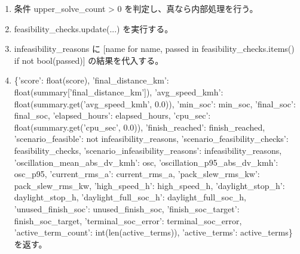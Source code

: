 \documentclass[a4paper,11pt]{article}
\begin{document}
\begin{enumerate}[leftmargin=1.8em]
\item 条件 upper\_solve\_count > 0 を判定し、真なら内部処理を行う。
\item   feasibility\_checks.update(...) を実行する。
\item infeasibility\_reasons に [name for name, passed in feasibility\_checks.items() if not bool(passed)] の結果を代入する。
\item \{'score': float(score), 'final\_distance\_km': float(summary['final\_distance\_km']), 'avg\_speed\_kmh': float(summary.get('avg\_speed\_kmh', 0.0)), 'min\_soc': min\_soc, 'final\_soc': final\_soc, 'elapsed\_hours': elapsed\_hours, 'cpu\_sec': float(summary.get('cpu\_sec', 0.0)), 'finish\_reached': finish\_reached, 'scenario\_feasible': not infeasibility\_reasons, 'scenario\_feasibility\_checks': feasibility\_checks, 'scenario\_infeasibility\_reasons': infeasibility\_reasons, 'oscillation\_mean\_abs\_dv\_kmh': osc, 'oscillation\_p95\_abs\_dv\_kmh': osc\_p95, 'current\_rms\_a': current\_rms\_a, 'pack\_slew\_rms\_kw': pack\_slew\_rms\_kw, 'high\_speed\_h': high\_speed\_h, 'daylight\_stop\_h': daylight\_stop\_h, 'daylight\_full\_soc\_h': daylight\_full\_soc\_h, 'unused\_finish\_soc': unused\_finish\_soc, 'finish\_soc\_target': finish\_soc\_target, 'terminal\_soc\_error': terminal\_soc\_error, 'active\_term\_count': int(len(active\_terms)), 'active\_terms': active\_terms\} を返す。
            \end{enumerate}
\end{document}
